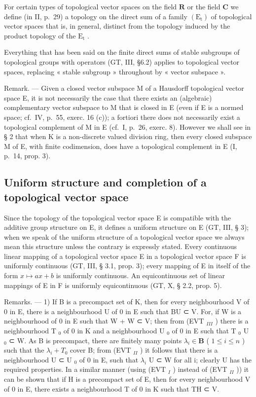 For certain types of topological vector spaces on the field \(\mathbf{R}\) or the field \(\mathbf{C}\) we define (in II, p.~29) a topology on the direct sum of a family \((\mathrm{E}_{\mathrm{t}})\) of topological vector spaces that is, in general, distinct from the topology induced by the product topology of the \(\mathrm{E}_{\mathrm{t}}\) .

Everything that has been said on the finite direct sums of stable subgroups of topological groups with operators (GT, III, §6.2) applies to topological vector spaces, replacing « stable subgroup » throughout by « vector subspace ».

Remark. --- Given a closed vector subspace M of a Hausdorff topological vector space E, it is not necessarily the case that there exists an (algebraic) complementary vector subspace to M that is closed in E (even if E is a normed space; cf.~IV, p.~55, exerc. 16 (c)); a fortiori there does not necessarily exist a topological complement of M in E (cf.~I, p.~26, exerc. 8). However we shall see in § 2 that when K is a non-discrete valued division ring, then every closed subspace M of E, with finite codimension, does have a topological complement in E (I, p.~14, prop. 3).

\subsection{Uniform structure and completion of a topological vector space}

Since the topology of the topological vector space E is compatible with the additive group structure on E, it defines a uniform structure on E (GT, III, § 3); when we speak of the uniform structure of a topological vector space we always mean this structure unless the contrary is expressly stated. Every continuous linear mapping of a topological vector space E in a topological vector space F is uniformly continuous (GT, III, § 3.1, prop. 3); every mapping of E in itself of the form \(x \mapsto ax + b\) is uniformly continuous. An equicontinuous set of linear mappings of E in F is uniformly equicontinuous (GT, X, § 2.2, prop. 5).

Remarks. --- 1) If B is a precompact set of K, then for every neighbourhood V of 0 in E, there is a neighbourhood U of 0 in E such that BU ⊂ V. For, if W is a neighbourhood of 0 in E such that W + W ⊂ V; then from (EVT \(_{III}\) ) there is a neighbourhood T \(_{0}\) of 0 in K and a neighbourhood U \(_{0}\) of 0 in E such that T \(_{0}\) U \(_{0}\) ⊂ W. As B is precompact, there are finitely many points \(\lambda_{i} \in \mathbf{B}\) ( \(1 \leqslant i \leqslant n\) ) such that the \(\lambda_{i} + T_{0}\) cover B; from (EVT \(_{II}\) ) it follows that there is a neighbourhood U ⊂ U \(_{0}\) of 0 in E, such that \(\lambda_{i}\) U ⊂ W for all i; clearly U has the required properties. In a similar manner (using (EVT \(_{I}\) ) instead of (EVT \(_{II}\) )) it can be shown that if H is a precompact set of E, then for every neighbourhood V of 0 in E, there exists a neighbourhood T of 0 in K such that TH ⊂ V.

